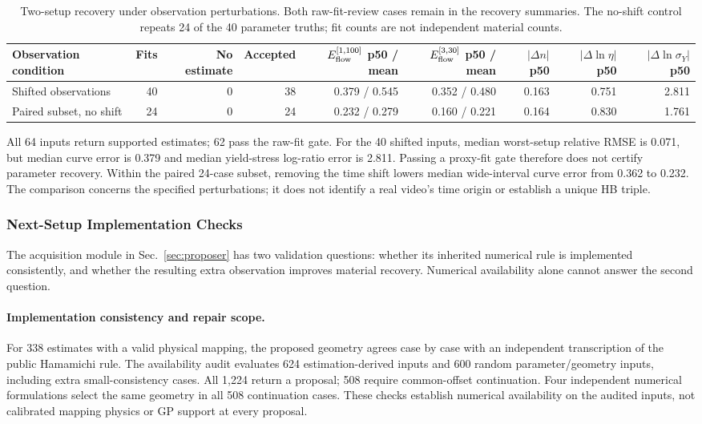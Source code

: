 \begin{table}[!htbp]
\centering\footnotesize
\setlength{\tabcolsep}{4pt}
\caption{Two-setup recovery under observation perturbations. Both raw-fit-review cases remain in the recovery summaries. The no-shift control repeats 24 of the 40 parameter truths; fit counts are not independent material counts.}
\label{tab:continuous-synthetic}
\begin{tabular}{@{}lrrrrrrrr@{}}
\toprule
Observation condition & Fits & No estimate & Accepted & $E_{\rm flow}^{[1,100]}$ p50 / mean & $E_{\rm flow}^{[3,30]}$ p50 / mean & $|\Delta n|$ p50 & $|\Delta\ln\eta|$ p50 & $|\Delta\ln\sigma_Y|$ p50 \\
\midrule
Shifted observations & 40 & 0 & 38 & 0.379 / 0.545 & 0.352 / 0.480 & 0.163 & 0.751 & 2.811 \\
Paired subset, no shift & 24 & 0 & 24 & 0.232 / 0.279 & 0.160 / 0.221 & 0.164 & 0.830 & 1.761 \\
\bottomrule
\end{tabular}
\end{table}

All 64 inputs return supported estimates; 62 pass the raw-fit gate.
For the 40 shifted inputs, median worst-setup relative RMSE is 0.071,
but median curve error is 0.379 and median yield-stress log-ratio
error is 2.811. Passing a proxy-fit gate therefore does not certify
parameter recovery. Within the paired 24-case subset, removing the
time shift lowers median wide-interval curve error from 0.362 to 0.232.
The comparison concerns the specified perturbations; it does not
identify a real video's time origin or establish a unique HB triple.



\subsubsection{Next-Setup Implementation Checks}
\label{sec:setup-validation}
The acquisition module in Sec.~\ref{sec:proposer} has two validation
questions: whether its inherited numerical rule is implemented
consistently, and whether the resulting extra observation improves
material recovery. Numerical availability alone cannot answer the
second question.

\paragraph{Implementation consistency and repair scope.}
For 338 estimates with a valid physical mapping, the proposed
geometry agrees case by case with an independent transcription of
the public Hamamichi rule. The availability audit evaluates 624
estimation-derived inputs and 600 random parameter/geometry inputs,
including extra small-consistency cases. All 1,224 return a proposal;
508 require common-offset continuation. Four independent numerical
formulations select the same geometry in all 508 continuation cases.
These checks establish numerical availability on the audited inputs,
not calibrated mapping physics or GP support at every proposal.

